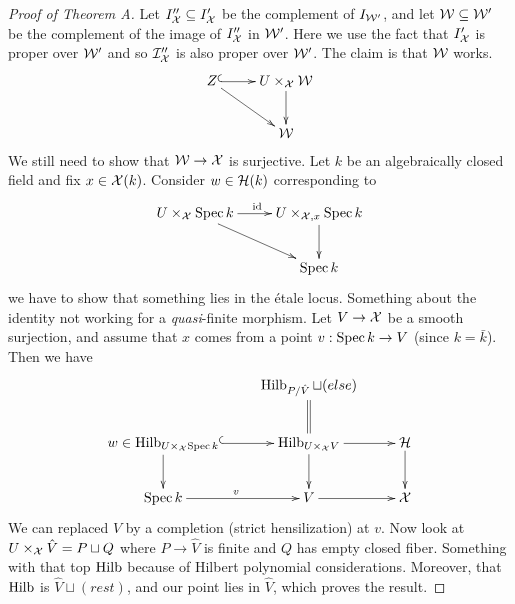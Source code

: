 \begin{proof}[Proof of Theorem A]
  Let $I_{\mathcal{X}}''\subseteq I_{\mathcal{X}} '$ be the complement of $I_{\mathcal{W}'}$, and
let $\mathcal{W}\subseteq \mathcal{W}'$ be the complement of the image of $I_{\mathcal{X}}''$ in
$\mathcal{W}'$. Here we use the fact that $I_{\mathcal{X}}'$ is proper over $\mathcal{W}'$ and so
$\mathcal{I}_{\mathcal{X}}''$ is also proper over $\mathcal{W}'$. The claim is that $\mathcal{W}$ works.
  \[\xymatrix{
   Z\ar@{^(->}[r] \ar[dr] & U\times_\X \W\ar[d]\\ & \W
  }\]
  We still need to show that $\mathcal{W}\to \mathcal{X}$ is surjective. Let $k$ be an
algebraically closed field and fix $x\in \mathcal{X}(k)$. Consider $w\in
\mathcal{H}(k)$ corresponding to
  \[\xymatrix{
    U\times_\X \spec k \ar[r]^\id \ar[dr] & U\times_{\X,x} \spec
k\ar[d]\\
    & \spec k
  }\]
  we have to show that something lies in the \'etale locus. Something
about the identity not working for a \emph{quasi}-finite morphism.
Let $V\to \mathcal{X}$ be a smooth surjection, and assume that $x$ comes from
a point $v:\operatorname{Spec} k\to V$ (since $k=\bar k$). Then we have
  \[\xymatrix{
    & \hilb_{P/\hat V} \sqcup (else)\ar@{=}[d]\\
    w\in \hilb_{U\times_\X \spec k} \ar@{^(->}[r]\ar[d]&
\hilb_{U\times_\X V} \ar[r]\ar[d]& \H\ar[d]\\
    \spec k \ar[r]^v & V\ar[r] & \X
  }\]
  We can replaced $V$ by a completion (strict hensilization) at $v$.
Now look at $U\times_{\mathcal{X}} \hat V=P\sqcup Q$ where $P\to \hat V$ is
finite and $Q$ has empty closed fiber. Something with that top
$\operatorname{Hilb}$ because of Hilbert polynomial considerations. Moreover, that
$\operatorname{Hilb}$ is $\hat V\sqcup (rest)$, and our point lies in $\hat V$,
which proves the result.
\end{proof}
